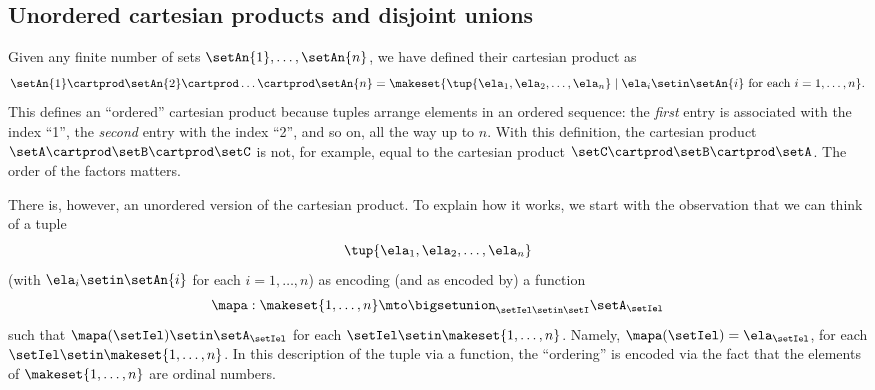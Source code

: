 
\subsection{Unordered cartesian products and disjoint unions}

Given any finite number of sets $\setAn{1}, \dots, \setAn{n}$, we have defined their cartesian product as
\begin{equation}
    \setAn{1} \cartprod \setAn{2} \cartprod \dots \cartprod \setAn{n} = \makeset{ \tup{\ela_{1}, \ela_{2}, \dots, \ela_{n}} \mid \ela_{i} \setin \setAn{i} \text{ for each } i = 1, \dots, n }.
\end{equation}
This defines an ``ordered'' cartesian product because tuples arrange elements in an ordered sequence: the \emph{first} entry is associated with the index ``1'', the \emph{second} entry with the index ``2'', and so on, all the way up to $n$.
With this definition, the cartesian product $\setA \cartprod \setB \cartprod \setC$ is not, for example, equal to the cartesian product $\setC \cartprod \setB \cartprod \setA$.
The order of the factors matters.

There is, however, an unordered version of the cartesian product.
To explain how it works, we start with the observation that we can think of a tuple
\begin{equation}
    \tup{\ela_{1}, \ela_{2}, \dots, \ela_{n}}
\end{equation}
(with $\ela_{i} \setin \setAn{i}$ for each $i = 1, \dots, n$) as encoding (and as encoded by) a function
\begin{equation}
    \mapa : \makeset{1, \dots, n} \mto \bigsetunion_{\setIel \setin\setI } \setA_{\setIel}
\end{equation}
such that $\mapa(\setIel) \setin\setA_{\setIel}$ for each $\setIel \setin \makeset{1, \dots, n}$.
Namely, $\mapa(\setIel) = \ela_\setIel$, for each $\setIel \setin \makeset{1, \dots, n}$.
In this description of the tuple via a function, the ``ordering'' is encoded via the fact that the elements of $\makeset{1, \dots, n}$ are ordinal numbers.

